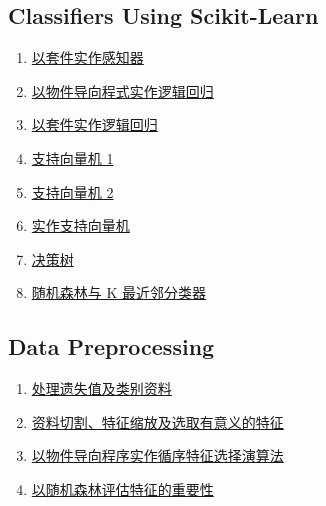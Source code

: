 \documentclass[11pt]{article}
\begin{document}
\subsection*{Classifiers Using Scikit-Learn}

\vspace{-0.25cm}

\begin{multicols}{2}
	\begin{enumerate}
		\item \href{https://mp.weixin.qq.com/s/hLdDC1hoSVYEww_VfWap0w}{以套件实作感知器}	%
		\item \href{https://mp.weixin.qq.com/s/uNoPquN9oRi64e1Sl9zr0w}{以物件导向程式实作逻辑回归}	%
		\item \href{https://mp.weixin.qq.com/s/0VH9HFePdZVMiqWbvaFzLw}{以套件实作逻辑回归}	%
		\item \href{https://mp.weixin.qq.com/s/EhuWxyETQQKSqLprzB-HYQ}{支持向量机 1}	%
		\item \href{https://mp.weixin.qq.com/s/o67kQOaKdeN-ZJijU2O7ag}{支持向量机 2}	%
		\item \href{https://mp.weixin.qq.com/s/W_b-hnmi3ztP1bHznlnf7Q}{实作支持向量机}	%
		\item \href{https://mp.weixin.qq.com/s/qyyUg_UeRBnGUiqdcRdeAQ}{决策树}	%
		\item \href{https://mp.weixin.qq.com/s/Vo_qt2rE3LiUjaRYPzkdpw}{随机森林与 K 最近邻分类器}	%
	\end{enumerate}
\end{multicols}

\subsection*{Data Preprocessing}

\vspace{-0.25cm}

\begin{multicols}{2}
	\begin{enumerate}
		\item \href{https://mp.weixin.qq.com/s/JNmnQSK1zwjzKVaippLCdQ}{处理遗失值及类别资料}	%
		\item \href{https://mp.weixin.qq.com/s/rfhQxhvFs_i4NM4MclSMBA}{资料切割、特征缩放及选取有意义的特征}	%
		\item \href{https://mp.weixin.qq.com/s/YnxEMD7ZF10Ep2pHR6hJvQ}{以物件导向程序实作循序特征选择演算法}	%
		\item \href{https://mp.weixin.qq.com/s/zIDofQXr1HBrtPP4I5WAgQ}{以随机森林评估特征的重要性}	%
	\end{enumerate}
\end{multicols}
\end{document}
